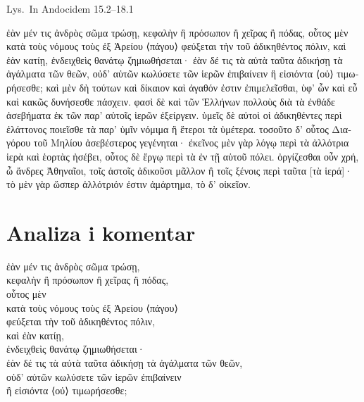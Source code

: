 Lys.\ In Andocidem 15.2–18.1


\medskip


{\large

\begin{greek}

\noindent ἐὰν μέν τις ἀνδρὸς σῶμα τρώσῃ, κεφαλὴν ἢ πρόσωπον ἢ χεῖρας ἢ πόδας, οὗτος μὲν κατὰ τοὺς νόμους τοὺς ἐξ Ἀρείου ⟨πάγου⟩ φεύξεται τὴν τοῦ ἀδικηθέντος πόλιν, καὶ ἐὰν κατίῃ, ἐνδειχθεὶς θανάτῳ ζημιωθήσεται· ἐὰν δέ τις τὰ αὐτὰ ταῦτα ἀδικήσῃ τὰ ἀγάλματα τῶν θεῶν, οὐδ' αὐτῶν κωλύσετε τῶν ἱερῶν ἐπιβαίνειν ἢ εἰσιόντα ⟨οὐ⟩ τιμωρήσεσθε; καὶ μὲν δὴ τούτων καὶ δίκαιον καὶ ἀγαθόν ἐστιν ἐπιμελεῖσθαι, ὑφ' ὧν καὶ εὖ καὶ κακῶς δυνήσεσθε πάσχειν. φασὶ δὲ καὶ τῶν Ἑλλήνων πολλοὺς διὰ τὰ ἐνθάδε ἀσεβήματα ἐκ τῶν παρ' αὐτοῖς ἱερῶν ἐξείργειν. ὑμεῖς δὲ αὐτοὶ οἱ ἀδικηθέντες περὶ ἐλάττονος ποιεῖσθε τὰ παρ' ὑμῖν νόμιμα ἢ ἕτεροι τὰ ὑμέτερα. τοσοῦτο δ' οὗτος Διαγόρου τοῦ Μηλίου ἀσεβέστερος γεγένηται· ἐκεῖνος μὲν γὰρ λόγῳ περὶ τὰ ἀλλότρια ἱερὰ καὶ ἑορτὰς ἠσέβει, οὗτος δὲ ἔργῳ περὶ τὰ ἐν τῇ αὑτοῦ πόλει. ὀργίζεσθαι οὖν χρή, ὦ ἄνδρες Ἀθηναῖοι, τοῖς ἀστοῖς ἀδικοῦσι μᾶλλον ἢ τοῖς ξένοις περὶ ταῦτα [τὰ ἱερά]· τὸ μὲν γὰρ ὥσπερ ἀλλότριόν ἐστιν ἁμάρτημα, τὸ δ' οἰκεῖον.

\end{greek}

}

\newpage

\section*{Analiza i komentar}


{\large
  
\begin{greek}
\noindent ἐὰν μέν τις ἀνδρὸς σῶμα τρώσῃ,\\
\tabto{2em} κεφαλὴν ἢ πρόσωπον ἢ χεῖρας ἢ πόδας,\\ 
οὗτος μὲν\\
\tabto{2em} κατὰ τοὺς νόμους τοὺς ἐξ Ἀρείου ⟨πάγου⟩\\
φεύξεται τὴν τοῦ ἀδικηθέντος πόλιν,\\
καὶ ἐὰν κατίῃ,\\
ἐνδειχθεὶς θανάτῳ ζημιωθήσεται·\\
ἐὰν δέ τις τὰ αὐτὰ ταῦτα ἀδικήσῃ τὰ ἀγάλματα τῶν θεῶν, \\
οὐδ' αὐτῶν κωλύσετε τῶν ἱερῶν ἐπιβαίνειν \\
ἢ εἰσιόντα ⟨οὐ⟩ τιμωρήσεσθε;\\

\end{greek}
}

